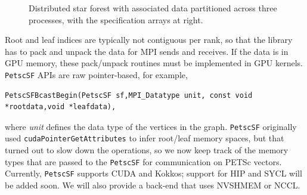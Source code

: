 \documentclass[10pt,journal,compsoc]{IEEEtran}
\begin{document}
\begin{figure}
{
  }
  \caption{Distributed star forest with associated data partitioned across three processes, with the specification arrays at right.
}
\label{fig:starpart}
\end{figure}

Root and leaf indices are typically not contiguous per rank, so that the library has to
pack and unpack the data for MPI sends and receives. If the data is in GPU memory, these
pack/unpack routines must be implemented in GPU kernels. {\tt PetscSF} APIs are raw pointer-based, for example, 
\begin{lstlisting}
PetscSFBcastBegin(PetscSF sf,MPI_Datatype unit, const void *rootdata,void *leafdata),
\end{lstlisting}
where \textit{unit} defines the data type of the
vertices in the graph. \texttt{PetscSF} originally used \texttt{cudaPointerGetAttributes}
to infer root/leaf memory spaces, but that turned out to slow down the operations, so we now keep track of the memory types that are passed to the
{\tt PetscSF} for communication on PETSc vectors. Currently, {\tt PetscSF} supports CUDA and Kokkos; support for HIP and
SYCL will be added soon. We will also provide a back-end that uses NVSHMEM or NCCL.
\end{document}
